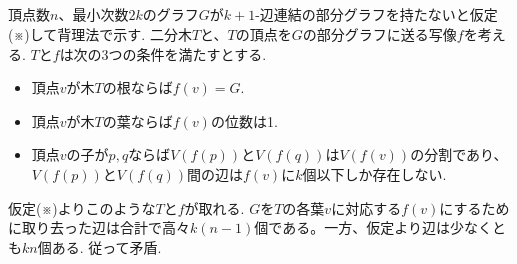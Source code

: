 \subsection{}
頂点数$n$、最小次数$2k$のグラフ$G$が$k+1$-辺連結の部分グラフを持たないと仮定(※)して背理法で示す.
二分木$T$と、$T$の頂点を$G$の部分グラフに送る写像$f$を考える.
$T$と$f$は次の3つの条件を満たすとする.
\begin{itemize}
 \item 頂点$v$が木$T$の根ならば$f(v)=G$.
 \item 頂点$v$が木$T$の葉ならば$f(v)$の位数は1.
 \item 頂点$v$の子が$p,q$ならば$V(f(p))$と$V(f(q))$は$V(f(v))$の分割であり、$V(f(p))$と$V(f(q))$間の辺は$f(v)$に$k$個以下しか存在しない.
\end{itemize}

仮定(※)よりこのような$T$と$f$が取れる. 
$G$を$T$の各葉$v$に対応する$f(v)$にするために取り去った辺は合計で高々$k(n-1)$個である。一方、仮定より辺は少なくとも$kn$個ある. 
従って矛盾. 
